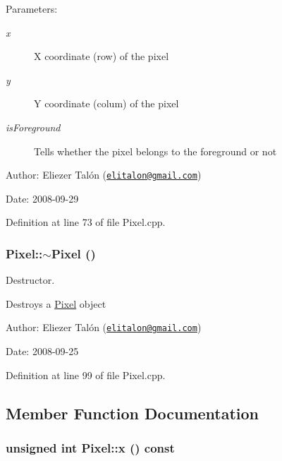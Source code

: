 \begin{Desc}
\item[Parameters:]
\begin{description}
\item[{\em x}]X coordinate (row) of the pixel \item[{\em y}]Y coordinate (colum) of the pixel \item[{\em isForeground}]Tells whether the pixel belongs to the foreground or not\end{description}
\end{Desc}
\begin{Desc}
\item[Author:]Eliezer Talón (\href{mailto:elitalon@gmail.com}{\tt elitalon@gmail.com}) \end{Desc}
\begin{Desc}
\item[Date:]2008-09-29 \end{Desc}


Definition at line 73 of file Pixel.cpp.\hypertarget{class_pixel_30f6aaf9a1d8792245070860546fa365}{
\subsubsection[$\sim$Pixel]{\setlength{\rightskip}{0pt plus 5cm}Pixel::$\sim$Pixel ()}}
\label{class_pixel_30f6aaf9a1d8792245070860546fa365}


Destructor. 

Destroys a \hyperlink{class_pixel}{Pixel} object

\begin{Desc}
\item[Author:]Eliezer Talón (\href{mailto:elitalon@gmail.com}{\tt elitalon@gmail.com}) \end{Desc}
\begin{Desc}
\item[Date:]2008-09-25 \end{Desc}


Definition at line 99 of file Pixel.cpp.

\subsection{Member Function Documentation}
\hypertarget{class_pixel_68dafccc4588fb33d445641c2766316b}{
\subsubsection[x]{\setlength{\rightskip}{0pt plus 5cm}unsigned int Pixel::x () const}}
\label{class_pixel_68dafccc4588fb33d445641c2766316b}


